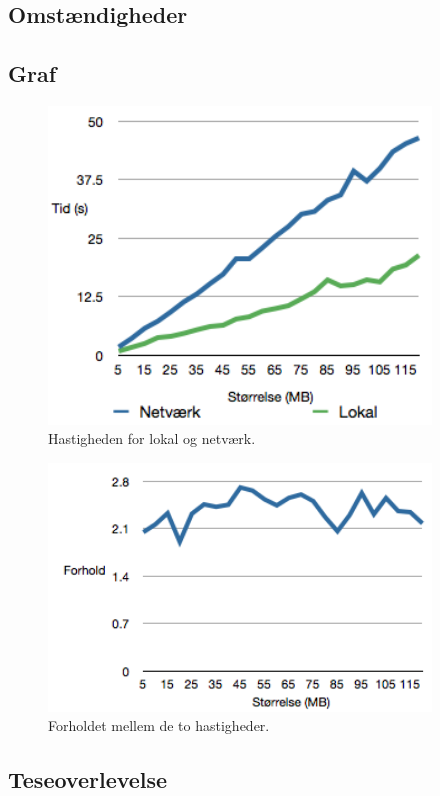 \documentclass{article}
\begin{document}
\subsection{Omstændigheder}

\subsection{Graf}

\begin{figure}
	\includegraphics[width=4in]{ploto.png}
	\caption{Hastigheden for lokal og netværk.}
	\label{ploto}
\end{figure}

\begin{figure}
	\includegraphics[width=4in]{plotforhold.png}
	\caption{Forholdet mellem de to hastigheder.}
	\label{plotforhold}
\end{figure}

\subsection{Teseoverlevelse}
\end{document}
